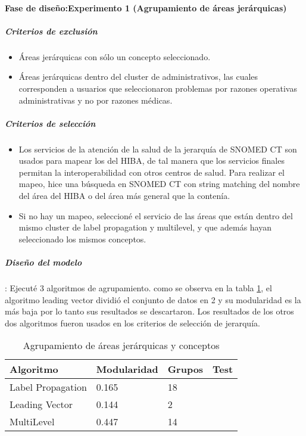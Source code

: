 \paragraph{Fase de diseño:Experimento 1 (Agrupamiento de áreas jerárquicas)}

\subparagraph{Criterios de exclusión}

\begin{itemize}
\item Áreas jerárquicas con sólo un concepto seleccionado.
\item Áreas jerárquicas dentro del cluster de administrativos, las cuales corresponden a usuarios que seleccionaron problemas por razones operativas administrativas y no por razones médicas.
\end{itemize}

\subparagraph{Criterios de selección}
\begin{itemize}
\item Los servicios de la atención de la salud de la jerarquía de SNOMED CT son usados para mapear los del HIBA, de tal manera que los servicios finales permitan la interoperabilidad con otros centros de salud. Para realizar el mapeo, hice una búsqueda en SNOMED CT con string matching del nombre del área del HIBA o del área más general que la contenía.
\item Si no hay un mapeo, seleccioné el servicio de las áreas que están dentro del mismo cluster de label propagation y multilevel, y que además hayan seleccionado los mismos conceptos.
\end{itemize}

\subparagraph{Diseño del modelo}: Ejecuté 3 algoritmos de agrupamiento. como se observa en la tabla \ref{clusteringAreas}, el algoritmo leading vector dividió el conjunto de datos en 2 y su modularidad es la más baja por lo tanto sus resultados se descartaron.  Los resultados de los otros dos algoritmos fueron usados en los criterios de selección de jerarquía.

\begin{table}[htb]
\centering
\caption{Agrupamiento de áreas jerárquicas y conceptos}
\label{clusteringAreas}
\begin{tabular}{@{}llll@{}}
\toprule
Algoritmo         & Modularidad & Grupos & Test \\ \midrule
Label Propagation & 0.165       & 18     &      \\
Leading Vector    & 0.144       & 2      &      \\
MultiLevel        & 0.447       & 14     &      \\ \bottomrule
\end{tabular}
\end{table}

